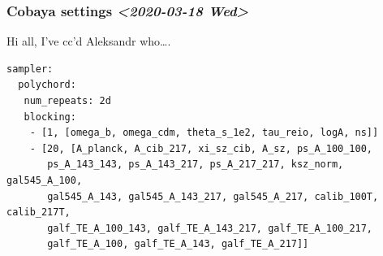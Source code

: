 \documentclass[11pt]{article}
\begin{document}
\subsubsection{Cobaya settings \textit{<2020-03-18 Wed>}}
\label{sec:orgf7e8f72}
Hi all, I've cc'd Aleksandr who\ldots{}.

\begin{verbatim}
sampler:
  polychord:
   num_repeats: 2d
   blocking:
    - [1, [omega_b, omega_cdm, theta_s_1e2, tau_reio, logA, ns]]
    - [20, [A_planck, A_cib_217, xi_sz_cib, A_sz, ps_A_100_100, 
       ps_A_143_143, ps_A_143_217, ps_A_217_217, ksz_norm, gal545_A_100, 
       gal545_A_143, gal545_A_143_217, gal545_A_217, calib_100T, calib_217T, 
       galf_TE_A_100_143, galf_TE_A_143_217, galf_TE_A_100_217, 
       galf_TE_A_100, galf_TE_A_143, galf_TE_A_217]]
\end{verbatim}


\end{document}
